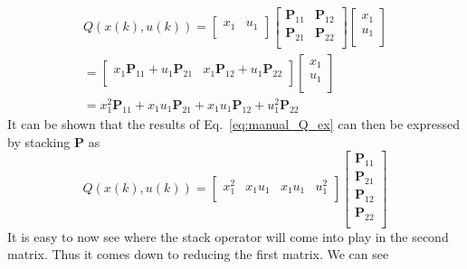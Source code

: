 \begin{equation}
    \begin{split}
        Q\left(x\left(k\right),u\left(k\right)\right)=\left[\begin{matrix}x_1&u_1\\\end{matrix}\right]\left[\begin{matrix}\textbf{P}_{11}&\textbf{P}_{12}\\\textbf{P}_{21}&\textbf{P}_{22}\\\end{matrix}\right]\left[\begin{matrix}x_1\\u_1\\\end{matrix}\right] \\
        =\left[\begin{matrix}x_1\textbf{P}_{11}+u_1\textbf{P}_{21}&x_1\textbf{P}_{12}+u_1\textbf{P}_{22}\\\end{matrix}\right]\left[\begin{matrix}x_1\\u_1\\\end{matrix}\right] \\
        =x_1^2\textbf{P}_{11}+x_1u_1\textbf{P}_{21}+x_1u_1\textbf{P}_{12}+u_1^2\textbf{P}_{22}
    \end{split}
    \label{eq:manual_Q_ex}
\end{equation}
It can be shown that the results of Eq.~\ref{eq:manual_Q_ex} can then be expressed by stacking \textbf{P} as
\begin{equation}
    Q\left(x\left(k\right),u\left(k\right)\right)=\left[\begin{matrix}x_1^2&x_1u_1&x_1u_1&u_1^2\\\end{matrix}\right]\left[\begin{matrix}\textbf{P}_{11}\\\textbf{P}_{21}\\\textbf{P}_{12}\\\textbf{P}_{22}\\\end{matrix}\right]
\end{equation}
It is easy to now see where the stack operator will come into play in the second matrix. Thus it comes down to reducing the first matrix. We can see
